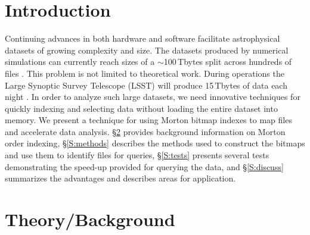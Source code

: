 \documentclass[apjl]{emulateapj}
\newcommand{\TB}{\,Tbytes}
\begin{document}
\section{Introduction}\label{S:intro}
Continuing advances in both hardware and software facilitate astrophysical datasets of growing complexity and size. The datasets produced by numerical simulations can currently reach sizes of a $\sim$100\TB{ }split across hundreds of files \citep[e.g.][]{Croft2015}. This problem is not limited to theoretical work. During operations the Large Synoptic Survey Telescope (LSST) will produce 15\TB{ }of data each night \citep{Juric2015a}. In order to analyze such large datasets, we need innovative techniques for quickly indexing and selecting data without loading the entire dataset into memory. We present a technique for using Morton bitmap indexes to map files and accelerate data analysis. \S\ref{S:theory} provides background information on Morton order indexing, \S\ref{S:methods} describes the methods used to construct the bitmaps and use them to identify files for queries, \S\ref{S:tests} presents several tests demonstrating the speed-up provided for querying the data, and \S\ref{S:discuss} summarizes the advantages and describes areas for application.

\section{Theory/Background}\label{S:theory}

\end{document}
